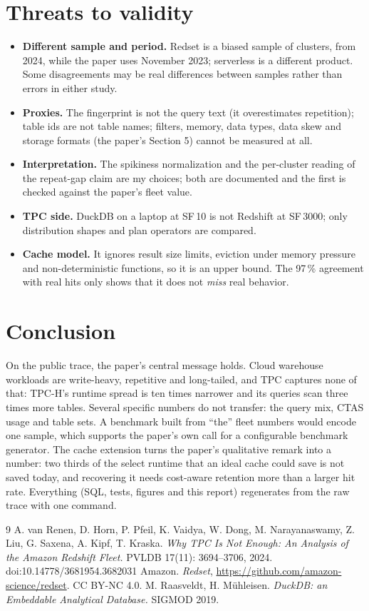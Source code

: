 \documentclass[10pt,a4paper]{article}
\begin{document}
\section{Threats to validity}
\begin{itemize}\setlength{\itemsep}{0pt}
\item \textbf{Different sample and period.} Redset is a biased sample of clusters, from 2024, while the paper uses November 2023; serverless is a different product. Some disagreements may be real differences between samples rather than errors in either study.
\item \textbf{Proxies.} The fingerprint is not the query text (it overestimates repetition); table ids are not table names; filters, memory, data types, data skew and storage formats (the paper's Section 5) cannot be measured at all.
\item \textbf{Interpretation.} The spikiness normalization and the per-cluster reading of the repeat-gap claim are my choices; both are documented and the first is checked against the paper's fleet value.
\item \textbf{TPC side.} DuckDB on a laptop at SF\,10 is not Redshift at SF\,3000; only distribution shapes and plan operators are compared.
\item \textbf{Cache model.} It ignores result size limits, eviction under memory pressure and non-deterministic functions, so it is an upper bound. The 97\,\% agreement with real hits only shows that it does not \emph{miss} real behavior.
\end{itemize}

\section{Conclusion}
On the public trace, the paper's central message holds. Cloud warehouse workloads are write-heavy, repetitive and long-tailed, and TPC captures none of that: TPC-H's runtime spread is ten times narrower and its queries scan three times more tables. Several specific numbers do not transfer: the query mix, CTAS usage and table sets. A benchmark built from ``the'' fleet numbers would encode one sample, which supports the paper's own call for a configurable benchmark generator. The cache extension turns the paper's qualitative remark into a number: two thirds of the select runtime that an ideal cache could save is not saved today, and recovering it needs cost-aware retention more than a larger hit rate. Everything (SQL, tests, figures and this report) regenerates from the raw trace with one command.

\begin{thebibliography}{9}\small
{} A. van Renen, D. Horn, P. Pfeil, K. Vaidya, W. Dong, M. Narayanaswamy, Z. Liu, G. Saxena, A. Kipf, T. Kraska. \emph{Why TPC Is Not Enough: An Analysis of the Amazon Redshift Fleet.} PVLDB 17(11): 3694--3706, 2024. doi:10.14778/3681954.3682031
 Amazon. \emph{Redset}, \url{https://github.com/amazon-science/redset}. CC BY-NC 4.0.
 M. Raasveldt, H. M\"uhleisen. \emph{DuckDB: an Embeddable Analytical Database.} SIGMOD 2019.
\end{thebibliography}
\end{document}
